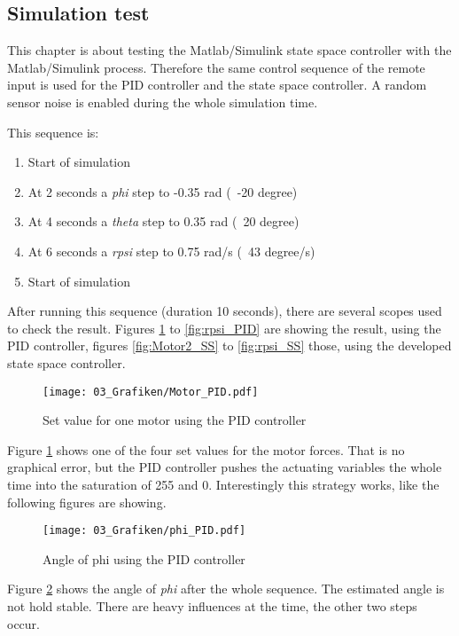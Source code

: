 \subsection{Simulation test}\label{chapter_SimulationTest}

This chapter is about testing the Matlab/Simulink state space controller with the Matlab/Simulink process. Therefore the same control sequence of the remote input is used for the PID controller and the state space controller. A random sensor noise is enabled during the whole simulation time.

This sequence is:
\begin{enumerate}
\item{Start of simulation}
\item{At 2 seconds a \textit{phi} step to -0.35 rad (~-20 degree)}
\item{At 4 seconds a \textit{theta} step to 0.35 rad (~20 degree)}
\item{At 6 seconds a \textit{rpsi} step to 0.75 rad/s (~43 degree/s)}
\item{Start of simulation}
\end{enumerate}
 
After running this sequence (duration 10 seconds), there are several scopes used to check the result. Figures \ref{fig:Motor_PID} to \ref{fig:rpsi_PID} are showing the result, using the PID controller, figures \ref{fig:Motor2_SS} to \ref{fig:rpsi_SS} those, using the developed state space controller.

\begin{figure}
	\centering
		\texttt{[image: 03\_Grafiken/Motor\_PID.pdf]}
	\caption{Set value for one motor using the PID controller}
	\label{fig:Motor_PID}
\end{figure}

Figure \ref{fig:Motor_PID} shows one of the four set values for the motor forces. That is no graphical error, but the PID controller pushes the actuating variables the whole time into the saturation of 255 and 0. Interestingly this strategy works, like the following figures are showing.

\begin{figure}
	\centering
		\texttt{[image: 03\_Grafiken/phi\_PID.pdf]}
	\caption{Angle of phi using the PID controller}
	\label{fig:phi_PID}
\end{figure}

Figure \ref{fig:phi_PID} shows the angle of \textit{phi} after the whole sequence. The estimated angle is not hold stable. There are heavy influences at the time, the other two steps occur.

